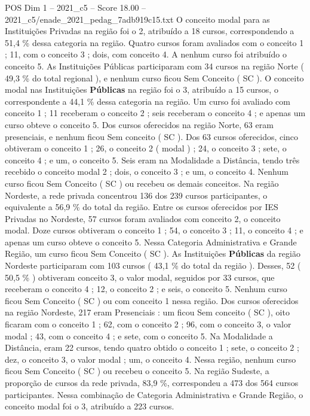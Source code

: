 \begin{textsample}{POS Dim 1 – 2021\_c5 – Score 18.00 – 2021\_c5/enade\_2021\_pedag\_7adb919c15.txt}
O conceito modal para as Instituições Privadas na região foi o 2, atribuído a 18 cursos, correspondendo a 51,4 \% dessa categoria na região.
Quatro cursos foram avaliados com o conceito 1 ; 11, com o conceito 3 ; dois, com conceito 4.
A nenhum curso foi atribuído o conceito 5.
As Instituições Públicas participaram com 34 cursos na região Norte ( 49,3 \% do total regional ), e nenhum curso ficou Sem Conceito ( SC ).
O conceito modal nas Instituições \textbf{Públicas} na região foi o 3, atribuído a 15 cursos, o correspondente a 44,1 \% dessa categoria na região.
Um curso foi avaliado com conceito 1 ; 11 receberam o conceito 2 ; seis receberam o conceito 4 ; e apenas um curso obteve o conceito 5.
Dos cursos oferecidos na região Norte, 63 eram presenciais, e nenhum ficou Sem conceito ( SC ).
Dos 63 cursos oferecidos, cinco obtiveram o conceito 1 ; 26, o conceito 2 ( modal ) ; 24, o conceito 3 ; sete, o conceito 4 ; e um, o conceito 5.
Seis eram na Modalidade a Distância, tendo três recebido o conceito modal 2 ; dois, o conceito 3 ; e um, o conceito 4.
Nenhum curso ficou Sem Conceito ( SC ) ou recebeu os demais conceitos.
Na região Nordeste, a rede privada concentrou 136 dos 239 cursos participantes, o equivalente a 56,9 \% do total da região.
Entre os cursos oferecidos por IES Privadas no Nordeste, 57 cursos foram avaliados com conceito 2, o conceito modal.
Doze cursos obtiveram o conceito 1 ; 54, o conceito 3 ; 11, o conceito 4 ; e apenas um curso obteve o conceito 5.
Nessa Categoria Administrativa e Grande Região, um curso ficou Sem Conceito ( SC ).
As Instituições \textbf{Públicas} da região Nordeste participaram com 103 cursos ( 43,1 \% do total da região ).
Desses, 52 ( 50,5 \% ) obtiveram conceito 3, o valor modal, seguidos por 33 cursos, que receberam o conceito 4 ; 12, o conceito 2 ; e seis, o conceito 5.
Nenhum curso ficou Sem Conceito ( SC ) ou com conceito 1 nessa região.
Dos cursos oferecidos na região Nordeste, 217 eram Presenciais : um ficou Sem conceito ( SC ), oito ficaram com o conceito 1 ; 62, com o conceito 2 ; 96, com o conceito 3, o valor modal ; 43, com o conceito 4 ; e sete, com o conceito 5.
Na Modalidade a Distância, eram 22 cursos, tendo quatro obtido o conceito 1 ; sete, o conceito 2 ; dez, o conceito 3, o valor modal ; um, o conceito 4.
Nessa região, nenhum curso ficou Sem Conceito ( SC ) ou recebeu o conceito 5.
Na região Sudeste, a proporção de cursos da rede privada, 83,9 \%, correspondeu a 473 dos 564 cursos participantes.
Nessa combinação de Categoria Administrativa e Grande Região, o conceito modal foi o 3, atribuído a 223 cursos.

\end{textsample}
